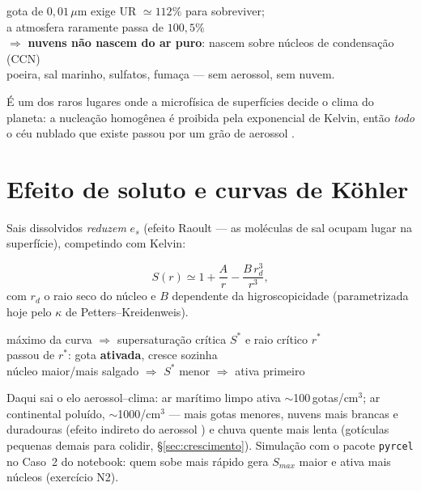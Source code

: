 \documentclass[11pt]{article}
\begin{document}
\begin{noquadro}
gota de $0{,}01\,\mu$m exige UR $\simeq 112\%$ para sobreviver;\\
a atmosfera raramente passa de $100{,}5\%$\\[2pt]
$\Rightarrow$ \textbf{nuvens não nascem do ar puro}: nascem sobre
núcleos de condensação (CCN)\\
poeira, sal marinho, sulfatos, fumaça — sem aerossol, sem nuvem.
\end{noquadro}

É um dos raros lugares onde a microfísica de superfícies decide o clima
do planeta: a nucleação homogênea é proibida pela exponencial de Kelvin,
então \emph{todo} o céu nublado que existe passou por um grão de
aerossol .

\section{Efeito de soluto e curvas de Köhler}\label{sec:kohler}


Sais dissolvidos \emph{reduzem} $e_s$ (efeito Raoult — as moléculas de
sal ocupam lugar na superfície), competindo com Kelvin:

\begin{formalivro}
\[ S(r) \simeq 1 + \frac{A}{r} - \frac{B\,r_d^3}{r^3}, \]
com $r_d$ o raio seco do núcleo e $B$ dependente da higroscopicidade
(parametrizada hoje pelo $\kappa$ de Petters--Kreidenweis).
\end{formalivro}

\begin{noquadro}[ativação]
máximo da curva $\Rightarrow$ supersaturação crítica $S^*$ e raio
crítico $r^*$\\
passou de $r^*$: gota \textbf{ativada}, cresce sozinha\\
núcleo maior/mais salgado $\Rightarrow$ $S^*$ menor $\Rightarrow$ ativa
primeiro
\end{noquadro}

Daqui sai o elo aerossol--clima: ar marítimo limpo ativa
$\sim$100\,gotas/cm$^3$; ar continental poluído, $\sim$1000/cm$^3$ —
mais gotas menores, nuvens mais brancas e duradouras (efeito indireto do
aerossol ) e chuva quente mais lenta
(gotículas pequenas demais para colidir, \S\ref{sec:crescimento}).
Simulação com o pacote \texttt{pyrcel} no Caso~2 do notebook: quem sobe
mais rápido gera $S_{max}$ maior e ativa mais núcleos (exercício N2).
\end{document}
